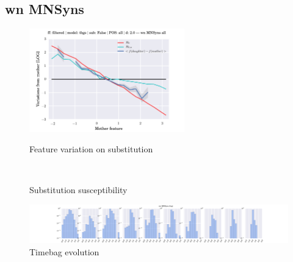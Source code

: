 \subsection{wn MNSyns}
\begin{figure}[h!]
    \centering
    \includegraphics[width=0.6\textwidth]{images/feature-cards/wn_MNSyns/feature_variations.png}
    \caption{Feature variation on substitution}
	~
	\caption{Substitution susceptibility}
    \includegraphics[width=\textwidth]{images/feature-cards/wn_MNSyns/timebags_evolution-hist.png}
	\caption{Timebag evolution}
\end{figure}


\clearpage

